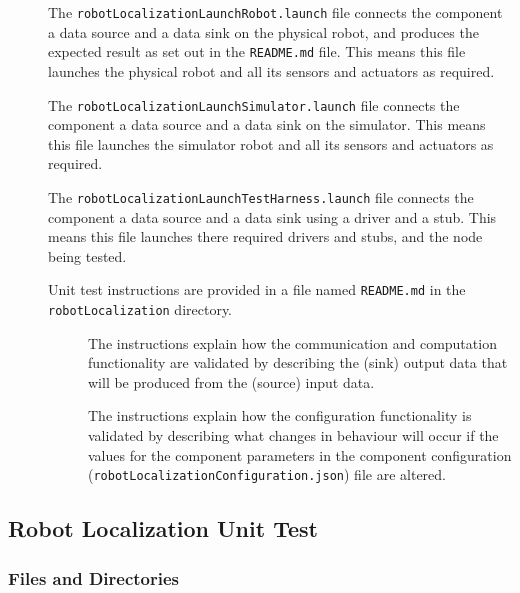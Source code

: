 \documentclass{CSSRforAfrica}
\newcommand{\checkboxChecked}{\fbox{\ding{51}}} %
\newcommand{\checkboxDashed}{\fbox{--}}         %
\begin{document}
\begin{description}
\item[\checkboxDashed] The {\small \verb+robotLocalizationLaunchRobot.launch+} file  connects the component a data source and a data sink on the physical robot, and produces the expected result as set out in the  \small {\texttt{README.md}}   file.    This means this file launches the physical robot and all its sensors and actuators as required.

\item[\checkboxDashed] The {\small \verb+robotLocalizationLaunchSimulator.launch+} file  connects the component a data source and a data sink on the simulator.    This means this file launches the simulator robot and all its sensors and actuators as required.

\item[\checkboxDashed] The {\small \verb+robotLocalizationLaunchTestHarness.launch+} file  connects the component a data source and a data sink using a driver and a stub.   This means this file launches there required drivers and stubs, and the node being tested.

\item[\checkboxChecked] Unit test instructions are provided in a file named {\small \verb+README.md+} in the {\small \verb+robotLocalization+} directory.

\begin{description}

\item[\checkboxChecked] The instructions  explain how the  communication and computation functionality are validated by describing the (sink) output data that will be produced from the (source) input data.  

\item[\checkboxChecked] The instructions  explain how the  configuration functionality is validated by describing what changes in behaviour will occur if the values for the component parameters in the component configuration ({\small \verb+robotLocalizationConfiguration.json+}) file are altered.

\end{description}

\end{description}

\subsection{Robot Localization Unit Test}

\subsubsection{Files and Directories}
\end{document}
